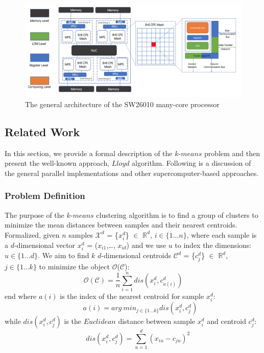 \begin{figure}
\centering
\includegraphics[scale=0.28]{Sunway.png}
\caption{The general architecture of the SW26010 many-core processor}
\label{figure:f1}
\end{figure} 



\subsection{Related Work}




In this section, we provide a formal description of the $k$-$means$ problem and then present the well-known approach, $Lloyd$ algorithm. Following is a discussion of the general parallel implementations and other supercomputer-based approaches.


\subsubsection{Problem Definition}
The purpose of the $k$-$means$ clustering algorithm is to find a group of clusters to minimize the mean distances between samples and their nearest centroids. Formalized, given $n$ samples {$\mathcal{X}^d$} = \{$x^d_i$\} $\in$ $\mathds{R}^d$, $i \in \{1\ldots n\}$, where each sample is a $d$-dimensional vector $x^d_i$ = ($x_{i1}$,\ldots, $x_{id}$) and we use $u$ to index the dimensions: $u \in \{ 1\ldots d \}$. We aim to find $k$ $d$-dimensional centroids {$\mathcal{C}^d$} = \{$c^d_j$\} $\in$ $\mathds{R}^d$, $j \in \{1 \ldots k\}$ to minimize the object $\mathcal{O}$($\mathcal{C}$):
$$  \mathcal{O}(\mathcal{C}) =    \frac{1}{n}\sum^{n}_{i=1} dis(x^d_i, c^d_{a(i)})   $$ end
where $a(i)$ is the index of the nearest centroid for sample $x^d_i$:
$$ \ \ \ \ \ \ \ \ \ a(i)= arg\ min_{j\in \{1 \ldots k \} } dis({x^d_i}, c^d_j) $$
while $dis(x^d_i, c^d_j)$ is the $Euclidean$ distance between sample $x^d_i$ and centroid $c^d_j$:
$$ \ \ \ \ \ \ dis(x^d_i, c^d_j) = \sum^{d}_{u=1}(x_{iu}-c_{ju})^2 $$

